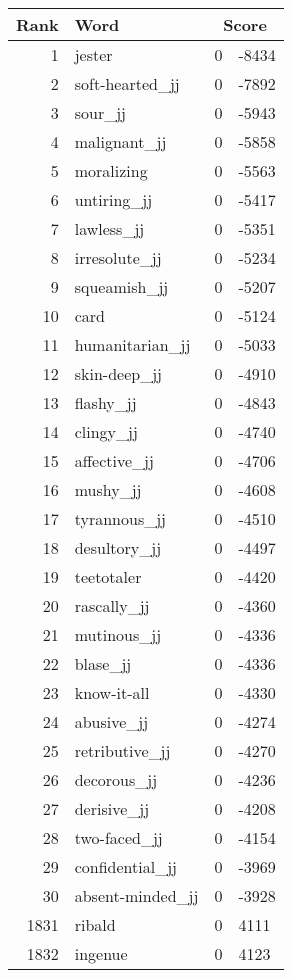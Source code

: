 \begin{longtable}[!htbp]{| rlr@{.}l |}
    \hline
    \textbf{Rank} & \textbf{Word} & \multicolumn{2}{c|}{\textbf{Score}} \\
    \hline
    \endhead
    1 & jester & 0 & -8434 \\
    2 & soft-hearted\_jj & 0 & -7892 \\
    3 & sour\_jj & 0 & -5943 \\
    4 & malignant\_jj & 0 & -5858 \\
    5 & moralizing & 0 & -5563 \\
    6 & untiring\_jj & 0 & -5417 \\
    7 & lawless\_jj & 0 & -5351 \\
    8 & irresolute\_jj & 0 & -5234 \\
    9 & squeamish\_jj & 0 & -5207 \\
    10 & card & 0 & -5124 \\
    11 & humanitarian\_jj & 0 & -5033 \\
    12 & skin-deep\_jj & 0 & -4910 \\
    13 & flashy\_jj & 0 & -4843 \\
    14 & clingy\_jj & 0 & -4740 \\
    15 & affective\_jj & 0 & -4706 \\
    16 & mushy\_jj & 0 & -4608 \\
    17 & tyrannous\_jj & 0 & -4510 \\
    18 & desultory\_jj & 0 & -4497 \\
    19 & teetotaler & 0 & -4420 \\
    20 & rascally\_jj & 0 & -4360 \\
    21 & mutinous\_jj & 0 & -4336 \\
    22 & blase\_jj & 0 & -4336 \\
    23 & know-it-all & 0 & -4330 \\
    24 & abusive\_jj & 0 & -4274 \\
    25 & retributive\_jj & 0 & -4270 \\
    26 & decorous\_jj & 0 & -4236 \\
    27 & derisive\_jj & 0 & -4208 \\
    28 & two-faced\_jj & 0 & -4154 \\
    29 & confidential\_jj & 0 & -3969 \\
    30 & absent-minded\_jj & 0 & -3928 \\
    1831 & ribald & 0 & 4111 \\
    1832 & ingenue & 0 & 4123 \\

\end{longtable}
